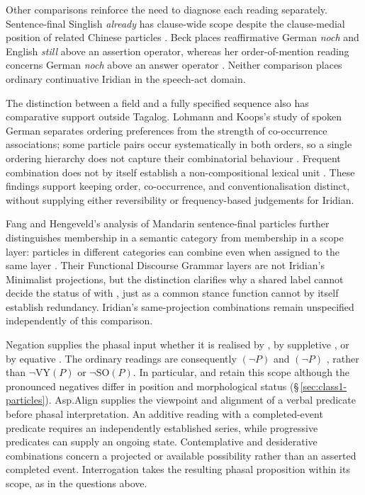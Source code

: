 Other comparisons reinforce the need to diagnose each reading separately.
Sentence-final Singlish \textit{already} has clause-wide scope despite the
clause-medial position of related Chinese particles
\cite{erlewine2023already}. Beck places reaffirmative German \textit{noch}
and English \textit{still} above an assertion operator, whereas her
order-of-mention reading concerns German \textit{noch} above an answer
operator \cite[§4.3, pp.~157--159]{beck2016still}. Neither comparison places
ordinary continuative Iridian  in the speech-act domain.

The distinction between a field and a fully specified sequence also has
comparative support outside Tagalog. Lohmann and Koops's study of spoken
German separates ordering preferences from the strength of co-occurrence
associations; some particle pairs occur systematically in both orders, so
a single ordering hierarchy does not capture their combinatorial behaviour
\cite[§§4--5.3]{lohmannkoops2026}. Frequent combination does not by itself
establish a non-compositional lexical unit
\cite[§5.4]{lohmannkoops2026}. These findings support keeping order,
co-occurrence, and conventionalisation distinct, without supplying either
reversibility or frequency-based judgements for Iridian.

Fang and Hengeveld's analysis of Mandarin sentence-final particles further
distinguishes membership in a semantic category from membership in a scope
layer: particles in different categories can combine even when assigned to
the same layer \cite[§5.5]{fanghengeveld2022}. Their Functional Discourse
Grammar layers are not Iridian's Minimalist projections, but the distinction
clarifies why a shared  label cannot decide the status of
 with , just as a common stance function cannot by
itself establish redundancy. Iridian's same-projection combinations remain
unspecified independently of this comparison.

Negation supplies the phasal input whether it is realised by ,
by suppletive , or by equative . The ordinary readings
are consequently $(\neg P)$  and
$(\neg P)$ , rather than
$\neg\mathrm{VY}(P)$ or $\neg\mathrm{SO}(P)$. In particular,
 and  retain this scope
although the pronounced negatives differ in position and morphological
status (§\,\ref{sec:class1-particles}). Asp.Align supplies the viewpoint
and alignment of a verbal predicate before phasal interpretation. An
additive reading with a completed-event predicate requires an independently
established series, while progressive predicates can supply an ongoing
state. Contemplative and desiderative
combinations concern a projected or available possibility rather than an
asserted completed event. Interrogation takes the resulting phasal
proposition within its scope, as in the  questions above.

